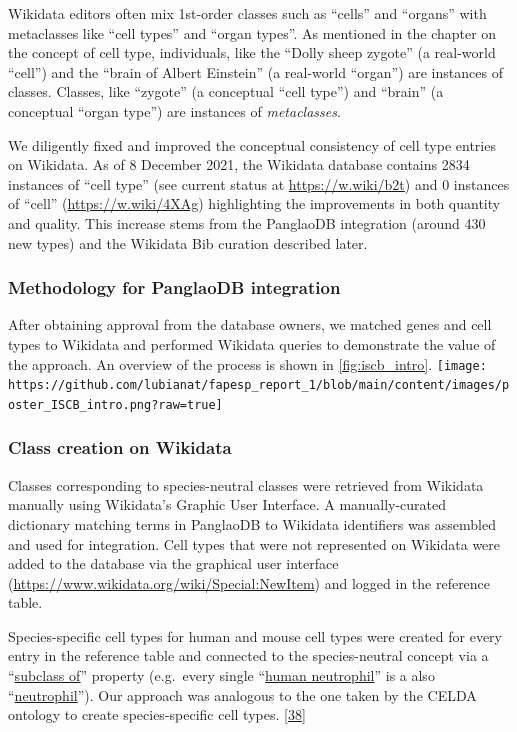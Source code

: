 Wikidata editors often mix 1st-order classes such as ``cells'' and ``organs'' with metaclasses like ``cell types'' and ``organ types''.
As mentioned in the chapter on the concept of cell type, individuals, like the ``Dolly sheep zygote'' (a real-world ``cell'') and the ``brain of Albert Einstein'' (a real-world ``organ'') are instances of classes.
Classes, like ``zygote'' (a conceptual ``cell type'') and ``brain'' (a conceptual ``organ type'') are instances of \emph{metaclasses}.

We diligently fixed and improved the conceptual consistency of cell type entries on Wikidata.
As of 8 December 2021, the Wikidata database contains 2834 instances of ``cell type'' (see current status at \url{https://w.wiki/b2t}) and 0 instances of ``cell'' (\url{https://w.wiki/4XAg}) highlighting the improvements in both quantity and quality.
This increase stems from the PanglaoDB integration (around 430 new types) and the Wikidata Bib curation described later.

\hypertarget{methodology-for-panglaodb-integration}{%
\subsubsection{Methodology for PanglaoDB integration}\label{methodology-for-panglaodb-integration}}

After obtaining approval from the database owners, we matched genes and cell types to Wikidata and performed Wikidata queries to demonstrate the value of the approach.
An overview of the process is shown in \ref{fig:iscb_intro}.
\texttt{[image: https://github.com/lubianat/fapesp\_report\_1/blob/main/content/images/poster\_ISCB\_intro.png?raw=true]}

\hypertarget{class-creation-on-wikidata}{%
\subsubsection{Class creation on Wikidata}\label{class-creation-on-wikidata}}

Classes corresponding to species-neutral classes were retrieved from Wikidata manually using Wikidata's Graphic User Interface.
A manually-curated dictionary matching terms in PanglaoDB to Wikidata identifiers was assembled and used for integration.
Cell types that were not represented on Wikidata were added to the database via the graphical user interface (\url{https://www.wikidata.org/wiki/Special:NewItem}) and logged in the reference table.

Species-specific cell types for human and mouse cell types were created for every entry in the reference table and connected to the species-neutral concept via a ``\href{http://www.wikidata.org/entity/P279}{subclass of}'' property (e.g.~every single ``\href{http://www.wikidata.org/entity/Q101405102}{human neutrophil}'' is a also ``\href{http://www.wikidata.org/entity/Q188417}{neutrophil}'').
Our approach was analogous to the one taken by the CELDA ontology to create species-specific cell types. {[}\protect\hyperlink{ref-RLHsA1U8}{38}{]}

